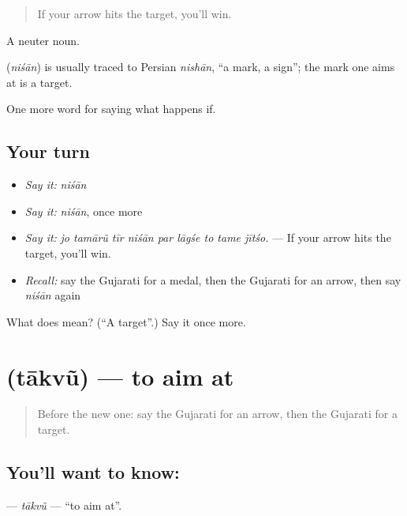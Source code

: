 \begin{quote}
If your arrow hits the target, you'll win.
\end{quote}

A neuter noun.

\begin{cousinweb}
\textbf{} (\emph{niśān}) is usually traced to Persian \emph{nishān}, \textquotedblleft{}a mark, a sign\textquotedblright{}; the mark one aims at is a target.
\end{cousinweb}

\begin{grammarlens}[title={What you've built}]
One more word for saying what happens if.
\end{grammarlens}

\subsection*{Your turn}
\begin{itemize}
\raggedright
  \item \emph{Say it:} \emph{niśān}
  \item \emph{Say it:} \emph{niśān}, once more
  \item \emph{Say it:} \emph{jo tamārũ tīr niśān par lāgśe to tame jītśo.} — If your arrow hits the target, you'll win.
  \item \emph{Recall:} say the Gujarati for a medal, then the Gujarati for an arrow, then say \emph{niśān} again
\end{itemize}

\begin{tcolorbox}[breakable,colback=teal!4,colframe=teal!35!black,title={Before you move on}]
What does  mean? (\textquotedblleft{}A target\textquotedblright{}.) Say it once more.
\end{tcolorbox}
\section[\texorpdfstring{\gu{તાકવું} (tākvũ)}{તાકવું (tākvũ)}]{ (tākvũ) — to aim at}

\label{lesson:GU-C550-taakvu}



\begin{quote}
Before the new one: say the Gujarati for an arrow, then the Gujarati for a target.
\end{quote}

\subsection*{You'll want to know: }
\textbf{} — \emph{tākvũ} — \textquotedblleft{}to aim at\textquotedblright{}.

